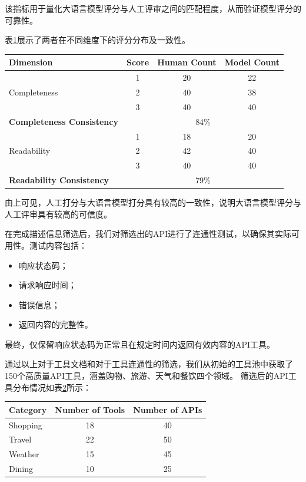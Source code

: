 该指标用于量化大语言模型评分与人工评审之间的匹配程度，从而验证模型评分的可靠性。

表\ref{tab:api_score_comparison}展示了两者在不同维度下的评分分布及一致性。

\begin{table}[h]
  \centering
  \label{tab:api_score_comparison}
  \begin{tabular}{l|c|c|c}
  \toprule
  \textbf{Dimension} & \textbf{Score} & \textbf{Human Count} & \textbf{Model Count} \\ \midrule
  \multirow{3}{*}{Completeness} & 1 & 20 & 22 \\ 
                                & 2 & 40 & 38 \\ 
                                & 3 & 40 & 40 \\ \hline
  \textbf{Completeness Consistency} & \multicolumn{3}{c}{84\%} \\ \midrule
  \multirow{3}{*}{Readability}  & 1 & 18 & 20 \\ 
                                & 2 & 42 & 40 \\ 
                                & 3 & 40 & 40 \\ \hline
  \textbf{Readability Consistency} & \multicolumn{3}{c}{79\%} \\ 
  \bottomrule
  \end{tabular}
  \end{table}

由上可见，人工打分与大语言模型打分具有较高的一致性，说明大语言模型评分与人工评审具有较高的可信度。

在完成描述信息筛选后，我们对筛选出的API进行了连通性测试，以确保其实际可用性。测试内容包括：
\begin{itemize}
    \item 响应状态码；
    \item 请求响应时间；
    \item 错误信息；
    \item 返回内容的完整性。
\end{itemize}

最终，仅保留响应状态码为正常且在规定时间内返回有效内容的API工具。

通过以上对于工具文档和对于工具连通性的筛选，我们从初始的工具池中获取了150个高质量API工具，涵盖购物、旅游、天气和餐饮四个领域。
筛选后的API工具分布情况如表\ref{tab:api_distribution}所示：

\begin{table}[h]
  \centering
  \label{tab:api_distribution}
  \begin{tabular}{l|c|c}
  \toprule
  \textbf{Category} & \textbf{Number of Tools} & \textbf{Number of APIs} \\ \midrule
  Shopping & 18 & 40 \\ \hline
  Travel   & 22 & 50 \\ \hline
  Weather  & 15 & 45 \\ \hline
  Dining   & 10 & 25 \\ 
  \bottomrule
  \end{tabular}
  \end{table}

